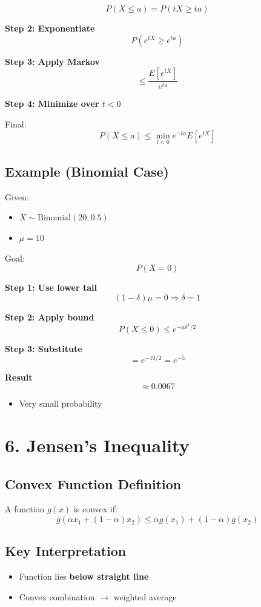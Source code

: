 \documentclass[11pt]{article}
\begin{document}
\[
P(X \le a) = P(tX \ge ta)
\]

\textbf{Step 2: Exponentiate}
\[
P(e^{tX} \ge e^{ta})
\]

\textbf{Step 3: Apply Markov}
\[
\le \frac{E[e^{tX}]}{e^{ta}}
\]

\textbf{Step 4: Minimize over $t < 0$}

Final:
\[
P(X \le a) \le \min_{t<0} e^{-ta} E[e^{tX}]
\]

\subsection*{Example (Binomial Case)}

Given:
\begin{itemize}
\item $X \sim \text{Binomial}(20, 0.5)$
\item $\mu = 10$
\end{itemize}

Goal:
\[
P(X = 0)
\]

\textbf{Step 1: Use lower tail}
\[
(1 - \delta)\mu = 0 \Rightarrow \delta = 1
\]

\textbf{Step 2: Apply bound}
\[
P(X \le 0) \le e^{-\mu \delta^2 / 2}
\]

\textbf{Step 3: Substitute}
\[
= e^{-10/2} = e^{-5}
\]

\textbf{Result}
\[
\approx 0.0067
\]

\begin{itemize}
\item Very small probability
\end{itemize}

\section*{6. Jensen’s Inequality}

\subsection*{Convex Function Definition}
A function $g(x)$ is convex if:
\[
g(\alpha x_1 + (1-\alpha)x_2)
\le \alpha g(x_1) + (1-\alpha)g(x_2)
\]

\subsection*{Key Interpretation}
\begin{itemize}
\item Function lies \textbf{below straight line}
\item Convex combination $\rightarrow$ weighted average
\end{itemize}
\end{document}
